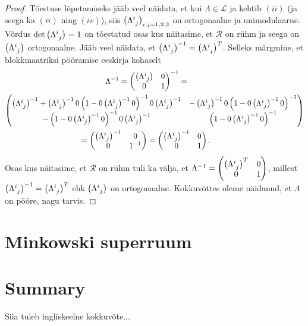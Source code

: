 \documentclass[a4paper,12pt]{article}
\theoremstyle{plain}
\theoremstyle{definition}
\numberwithin{equation}{section}
\begin{document}
\begin{proof}
Tõestuse lõpetamiseks jääb veel näidata, et kui $\Lambda \in \mathcal{L}$ ja kehtib $(ii)$ (ja seega ka $(ii)$ ning $(iv)$), siis $\left(\Lambda\indices{^i_j}\right)_{i,j = 1, 2, 3}$ on ortogonaalne ja unimodulaarne. Võrdus $\det \left(\Lambda\indices{^i_j}\right) = 1$ on tõestatud osas kus näitasime, et $\mathcal{R}$ on rühm ja seega on $\left(\Lambda\indices{^i_j}\right)$ ortogonaalne. Jääb veel näidata, et $\left(\Lambda\indices{^i_j}\right)^{-1} = \left(\Lambda\indices{^i_j}\right)^T$. Selleks märgmine, et blokkmaatriksi pööramise eeskirja kohaselt
\begin{align*}
\Lambda^{-1} = 
\begin{pmatrix}
\left(\Lambda\indices{^i_j}\right) & 0 \\
0 & 1 \\ 
\end{pmatrix}^{-1} = \qquad\qquad\qquad\qquad\qquad\qquad\qquad\quad\\
\begin{pmatrix}
\left(\Lambda\indices{^i_j}\right)^{-1} + \left(\Lambda\indices{^i_j}\right)^{-1} 0  \left(1-0 \left(\Lambda\indices{^i_j}\right)
^{-1} 0 \right)^{-1} 0 \left(\Lambda\indices{^i_j}\right)^{-1} & -\left(\Lambda\indices{^i_j}\right)^{-1} 0 \left(1 - 0 \left
(\Lambda\indices{^i_j}\right)^{-1} 0 \right)^{-1} \\
-\left(1 - 0 \left(\Lambda\indices{^i_j}\right)^{-1} 0\right)^{-1} 0 \left(\Lambda\indices{^i_j}\right)^{-1} & \left(1 - 0 \left
(\Lambda\indices{^i_j}\right)^{-1} 0 \right)^{-1} \\
\end{pmatrix} \\
 = \begin{pmatrix}
\left(\Lambda\indices{^i_j}\right)^{-1} & 0 \\
0 & 1^{-1} \\ 
\end{pmatrix} = 
\begin{pmatrix}
\left(\Lambda\indices{^i_j}\right)^{-1} & 0 \\
0 & 1 \\ 
\end{pmatrix}. \qquad\qquad\qquad\qquad\qquad\qquad
\end{align*}
Osas kus näitasime, et $\mathcal{R}$ on rühm tuli ka välja, et $\Lambda^{-1} = \begin{pmatrix} \left(\Lambda\indices{^i_j}\right)^T & 0 \\ 0 & 1 \\ \end{pmatrix}$, millest $\left(\Lambda\indices{^i_j}\right)^{-1} = \left(\Lambda\indices{^i_j}\right)^T$ ehk $\left(\Lambda\indices{^i_j}\right)$ on ortogonaalne. Kokkuvõttes oleme näidanud, et $\Lambda$ on pööre, nagu tarvis.
\end{proof}

\newpage
\section{Minkowski superruum}

\newpage
\section*{Summary}
Siia tuleb ingliskeelne kokkuvõte...

\newpage
{}


\end{document}
